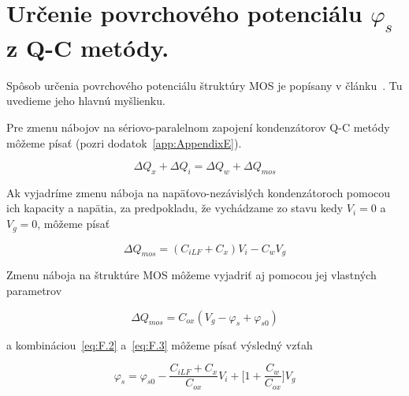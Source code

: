 
\chapter{Určenie povrchového potenciálu $\varphi_s$ z Q-C metódy.}\label{app:AppendixF}

Spôsob určenia povrchového potenciálu štruktúry MOS je popísany v
článku~\cite{App.3}. Tu uvedieme jeho hlavnú myšlienku.

Pre zmenu nábojov na sériovo-paralelnom zapojení kondenzátorov Q-C
metódy môžeme písať (pozri dodatok~\ref{app:AppendixE}).

\begin{equation}\label{eq:F.1}
  \Delta Q_x + \Delta Q_i = \Delta Q_w + \Delta Q_{mos}
\end{equation}

Ak vyjadríme zmenu náboja na napäťovo-nezávislých kondenzátoroch
pomocou ich kapacity a napätia, za predpokladu, že vychádzame zo stavu
kedy $V_i=0$ a $V_g=0$, môžeme písať

\begin{equation}\label{eq:F.2}
  \Delta Q_{mos} = (C_{iLF} + C_{x})V_{i} - C_{w}V_{g}
\end{equation}

Zmenu náboja na štruktúre MOS môžeme vyjadriť aj pomocou jej vlastných
parametrov

\begin{equation}\label{eq:F.3}
  \Delta Q_{mos} = C_{ox}(V_{g} - \varphi_{s} + \varphi_{s0})
\end{equation}

a kombináciou~\ref{eq:F.2} a~\ref{eq:F.3} môžeme písať výsledný vzťah

\begin{equation}\label{eq:F.4}
  \varphi_{s} = \varphi_{s0} - \frac{C_{iLF} + C_{x}}{C_{ox}}V_i + {\Big[1 + \frac{C_{w}}{C_{ox}}\Big]}V_{g}
\end{equation}

